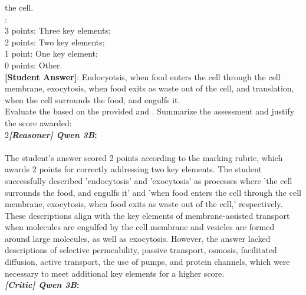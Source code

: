 \begin{figure*}
\begin{tcolorbox}[
    colback=gray!10,      %
    colframe=gray!80,     %
    title=Case Study 5,
    fonttitle=\bfseries,  %
    rounded corners,
    boxrule=0.5mm,        %
    width=\linewidth
]
the cell.\\
:\\
3 points: Three key elements;\\
2 points: Two key elements;\\
1 point: One key element;\\
0 points: Other.\\
\textbf{[Student Answer]}: Endocyotsis, when food enters the cell through the cell membrane, exocytosis, when food exits as waste out of the cell, and translation, when the cell surrounds the food, and engulfs it.\\
Evaluate the  based on the provided  and . Summarize the assessment and justify the score awarded:\\
\textcircled{\raisebox{-0.3pt} {\scriptsize2}}\textbf{\emph{[Reasoner] Qwen 3B}:}\\\\
The student's answer scored 2 points according to the marking rubric, which awards 2 points for correctly addressing two key elements. The student successfully described 'endocytosis' and 'exocytosis' as processes where 'the cell surrounds the food, and engulfs it' and 'when food enters the cell through the cell membrane, exocytosis, when food exits as waste out of the cell,' respectively. These descriptions align with the key elements of membrane-assisted transport when molecules are engulfed by the cell membrane and vesicles are formed around large molecules, as well as exocytosis. However, the answer lacked descriptions of selective permeability, passive transport, osmosis, facilitated diffusion, active transport, the use of pumps, and protein channels, which were necessary to meet additional key elements for a higher score.\\
\textbf{\emph{[Critic] Qwen 3B}:}\\

\end{tcolorbox}
\end{figure*}
